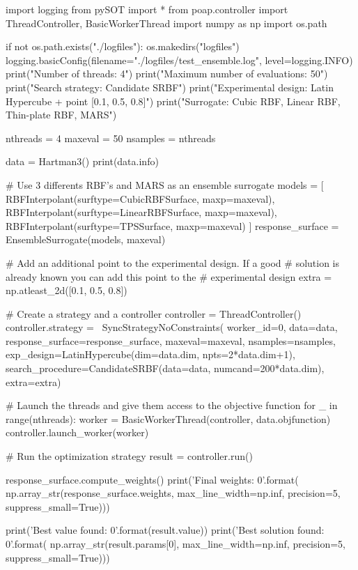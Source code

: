 \documentclass[]{article}
\begin{document}
\begin{python}
import logging
from pySOT import *
from poap.controller import ThreadController, BasicWorkerThread
import numpy as np
import os.path

if not os.path.exists("./logfiles"):
    os.makedirs("logfiles")
logging.basicConfig(filename="./logfiles/test_ensemble.log",
                    level=logging.INFO)
print("Number of threads: 4")
print("Maximum number of evaluations: 50")
print("Search strategy: Candidate SRBF")
print("Experimental design: Latin Hypercube + point [0.1, 0.5, 0.8]")
print("Surrogate: Cubic RBF, Linear RBF, Thin-plate RBF, MARS")

nthreads = 4
maxeval = 50
nsamples = nthreads

data = Hartman3()
print(data.info)

# Use 3 differents RBF's and MARS as an ensemble surrogate
models = [
    RBFInterpolant(surftype=CubicRBFSurface, maxp=maxeval),
    RBFInterpolant(surftype=LinearRBFSurface, maxp=maxeval),
    RBFInterpolant(surftype=TPSSurface, maxp=maxeval)
]
response_surface = EnsembleSurrogate(models, maxeval)

# Add an additional point to the experimental design. If a good
# solution is already known you can add this point to the
# experimental design
extra = np.atleast_2d([0.1, 0.5, 0.8])

# Create a strategy and a controller
controller = ThreadController()
controller.strategy = \
    SyncStrategyNoConstraints(
        worker_id=0, data=data,
        response_surface=response_surface,
        maxeval=maxeval, nsamples=nsamples,
        exp_design=LatinHypercube(dim=data.dim, npts=2*data.dim+1),
        search_procedure=CandidateSRBF(data=data, numcand=200*data.dim),
        extra=extra)

# Launch the threads and give them access to the objective function
for _ in range(nthreads):
    worker = BasicWorkerThread(controller, data.objfunction)
    controller.launch_worker(worker)

# Run the optimization strategy
result = controller.run()

response_surface.compute_weights()
print('Final weights: {0}'.format(
    np.array_str(response_surface.weights, max_line_width=np.inf,
                 precision=5, suppress_small=True)))

print('Best value found: {0}'.format(result.value))
print('Best solution found: {0}'.format(
    np.array_str(result.params[0], max_line_width=np.inf,
                 precision=5, suppress_small=True)))
\end{python}
\end{document}
